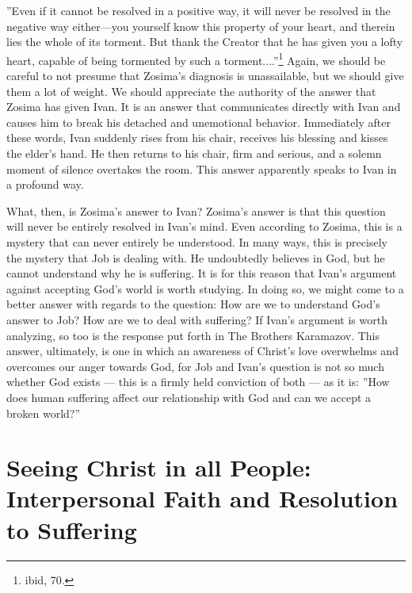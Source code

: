 ''Even if it cannot be resolved in a positive way, it will never be resolved in the negative way either---you yourself know this property of your heart, and therein lies the whole of its torment. But thank the Creator that he has given you a lofty heart, capable of being tormented by such a torment....''\footnote{ibid, 70.} Again, we should be careful to not presume that Zosima's diagnosis is unassailable, but we should give them a lot of weight. We should appreciate the authority of the answer that Zosima has given Ivan. It is an answer that communicates directly with Ivan and causes him to break his detached and unemotional behavior. Immediately after these words, Ivan suddenly rises from his chair, receives his blessing and kisses the elder's hand. He then returns to his chair, firm and serious, and a solemn moment of silence overtakes the room. This answer apparently speaks to Ivan in a profound way.

What, then, is Zosima's answer to Ivan? Zosima's answer is that this question will never be entirely resolved in Ivan's mind. Even according to Zosima, this is a mystery that can never entirely be understood. In many ways, this is precisely the mystery that Job is dealing with. He undoubtedly believes in God, but he cannot understand why he is suffering. It is for this reason that Ivan's argument against accepting God's world is worth studying. In doing so, we might come to a better answer with regards to the question: How are we to understand God's answer to Job? How are we to deal with suffering? If Ivan's argument is worth analyzing, so too is the response put forth in The Brothers Karamazov. This answer, ultimately, is one in which an awareness of Christ's love overwhelms and overcomes our anger towards God, for Job and Ivan's question is not so much whether God exists --- this is a firmly held conviction of both --- as it is: ''How does human suffering affect our relationship with God and can we accept a broken world?''        

\section{Seeing Christ in all People: Interpersonal Faith and Resolution to Suffering}

